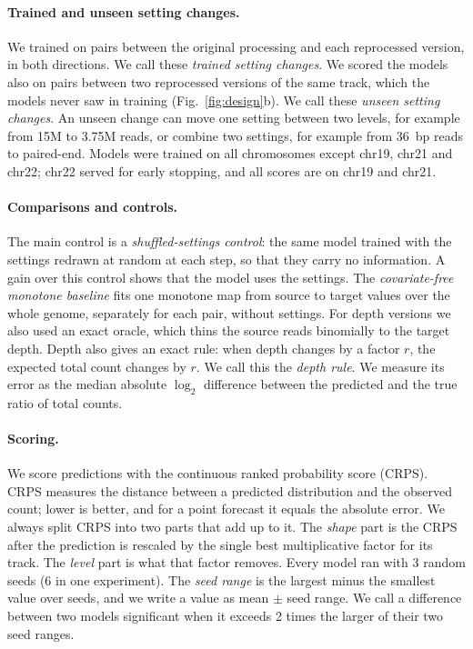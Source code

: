 \documentclass[pdflatex,sn-mathphys-num]{sn-jnl}
\newcommand{\lit}[1]{#1}
\begin{document}
\paragraph{Trained and unseen setting changes.} We trained on pairs between the original
processing and each reprocessed version, in both directions. We call these \emph{trained
setting changes}. We scored the models also on pairs between two reprocessed versions of the
same track, which the models never saw in training (Fig.~\ref{fig:design}b). We call these
\emph{unseen setting changes}. An unseen change can move one setting between two levels, for
example from \lit{15}M to \lit{3.75}M reads, or combine two settings, for example from
\lit{36}~bp reads to paired-end. Models were trained on all chromosomes except \lit{chr19},
\lit{chr21} and \lit{chr22}; \lit{chr22} served for early stopping, and all scores are on
\lit{chr19} and \lit{chr21}.

\paragraph{Comparisons and controls.} The main control is a \emph{shuffled-settings control}:
the same model trained with the settings redrawn at random at each step, so that they carry no
information. A gain over this control shows that the model uses the settings. The
\emph{covariate-free monotone baseline} fits one monotone map from source to target values over
the whole genome, separately for each pair, without settings. For depth versions we also used
an exact oracle, which thins the source reads binomially to the target depth. Depth also gives
an exact rule: when depth changes by a factor $r$, the expected total count changes by $r$. We
call this the \emph{depth rule}. We measure its error as the median absolute $\log_{\lit{2}}$
difference between the predicted and the true ratio of total counts.

\paragraph{Scoring.} We score predictions with the continuous ranked probability score (CRPS).
CRPS measures the distance between a predicted distribution and the observed count; lower is
better, and for a point forecast it equals the absolute error. We always split CRPS into two
parts that add up to it. The \emph{shape} part is the CRPS after the prediction is rescaled by
the single best multiplicative factor for its track. The \emph{level} part is what that factor
removes. Every model ran with \lit{3} random seeds (\lit{6} in one experiment). The \emph{seed
range} is the largest minus the smallest value over seeds, and we write a value as mean $\pm$
seed range. We call a difference between two models significant when it exceeds \lit{2} times
the larger of their two seed ranges.
\end{document}
